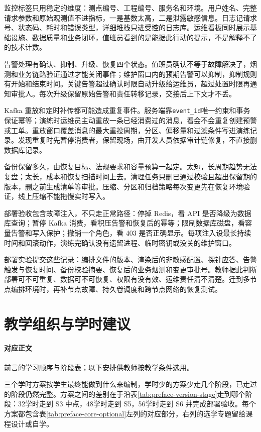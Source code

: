 监控标签只用稳定的维度：测点编号、工程编号、服务名和环境。用户姓名、完整请求参数和原始观测值不进指标，一是基数太高，二是泄露敏感信息。日志记请求号、状态码、耗时和错误类型，详细堆栈只进受控的日志库。运维看板同时展示基础设施、数据质量和业务闭环，值班员看到的是能据此行动的提示，不是解释不了的技术计数。

告警处理有确认、抑制、升级、恢复四个状态。值班员确认不等于故障解决了，烟测和业务链路验证通过才能关闭事件；维护窗口内的预期告警可以抑制，抑制规则有开始和结束时间。关键告警超过确认时限自动升级给运维员，超过处置时限再通知审批人。每次升级保留原始告警和责任转移记录，交接后上下文才不丢。

Kafka 重放和定时补传都可能造成重复事件。服务端靠\texttt{event\_id}唯一约束和事务保证幂等；演练时运维员主动重放一条已经消费过的消息，看会不会重复创建预警或工单。重放窗口覆盖消息的最大重投周期，分区、偏移量和过滤条件写进演练记录。发现重复时先暂停消费者，保留现场，由开发人员依据审计链修复，不直接删数据库记录。

备份保留多久，由恢复目标、法规要求和容量预算一起定。太短，长周期趋势无法复盘；太长，成本和恢复扫描时间上去。清理任务只删已通过校验且超出保留期的版本，删之前生成清单等审批。压缩、分区和归档策略每次变更先在恢复环境验证，线上压缩不能拖慢实时写入。

部署验收包含故障注入，不只走正常路径：停掉 Redis，看 API 是否降级为数据库查询；暂停 Kafka 消费，看积压告警和恢复后的幂等；限制数据库磁盘，看容量告警和写入保护；撤销一个角色，看 403 是否正确显示。每项注入设最长持续时间和回滚动作，演练完确认没有遗留进程、临时密钥或没关的维护窗口。

部署实验提交这些记录：编排文件的版本、渲染后的非敏感配置、探针应答、告警触发与恢复时间、备份校验摘要、恢复后的业务烟测和变更审批号。教师据此判断部署可不可重复、数据可不可恢复、权限有没有效、运维责任清不清楚。迁到多节点编排环境时，再补节点故障、持久卷调度和跨节点网络的恢复测试。


\section{教学组织与学时建议}\label{online:teaching-guide}

\paragraph{对应正文}前言的学习顺序与阶段表；以下安排供教师按教学条件选用。

三个学时方案按学生最终能做到什么来编制，学时少的方案少走几个阶段，已走过的阶段仍然完整。方案之间的差别在于沿表\ref{tab:preface-version-stage}走到哪个阶段：32学时走到 S3 中点，48学时走到 S5，56学时走到 S6 并完成部署验收。每个方案都包含表\ref{tab:preface-core-optional}左列的对应部分，右列的选学专题留给课程设计或自学。

